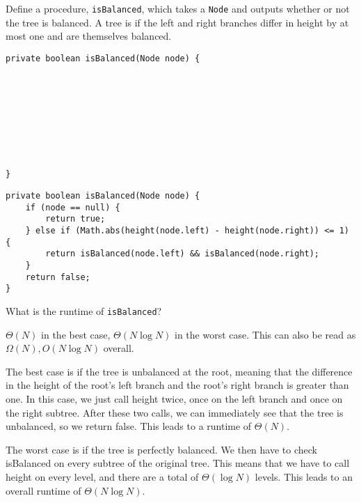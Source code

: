 \question Define a procedure, \texttt{isBalanced}, which takes a \texttt{Node} and outputs whether or not the tree is balanced. A tree is  if the left and right branches differ in height by at most one and are themselves balanced.

\ifprintanswers
\else
\begin{lstlisting}
private boolean isBalanced(Node node) {









}
\end{lstlisting}
\fi

\begin{solution}
\begin{lstlisting}
private boolean isBalanced(Node node) {
    if (node == null) {
        return true;
    } else if (Math.abs(height(node.left) - height(node.right)) <= 1) {
        return isBalanced(node.left) && isBalanced(node.right);
    }
    return false;
}
\end{lstlisting}
\end{solution}

What is the runtime of \texttt{isBalanced}?
\begin{solution}[0.25in]
$\Theta(N)$ in the best case, $\Theta(N \log N)$ in the worst case.  This can also be read as $\Omega(N), O(N \log N)$ overall.

The best case is if the tree is unbalanced at the root, meaning that the difference in the height of the root's left branch and the root's right branch is greater than one.  In this case, we just call height twice, once on the left branch and once on the right subtree.  After these two calls, we can immediately see that the tree is unbalanced, so we return false.  This leads to a runtime of $\Theta(N)$.

The worst case is if the tree is perfectly balanced.  We then have to check isBalanced on every subtree of the original tree.  This means that we have to call height on every level, and there are a total of $\Theta(\log N)$ levels.  This leads to an overall runtime of $\Theta(N \log N)$.
\end{solution}